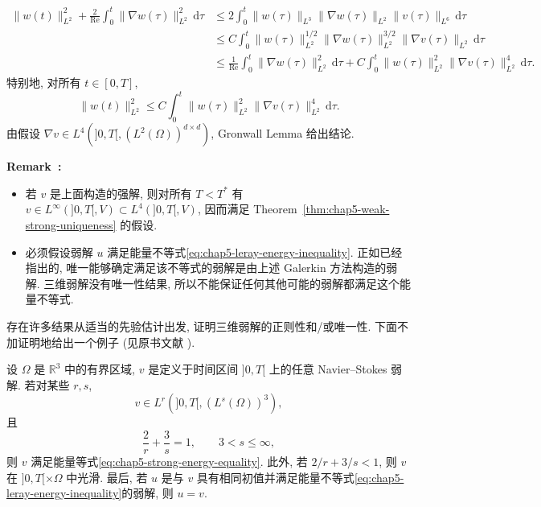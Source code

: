 \begin{Proof}
\begin{align*}
 \|w(t)\|_{L^2}^2+\frac2{\operatorname{Re}}\int_0^t\|\nabla w(\tau)\|_{L^2}^2\,\mathrm d\tau
 &\leq2\int_0^t\|w(\tau)\|_{L^3}\|\nabla w(\tau)\|_{L^2}\|v(\tau)\|_{L^6}\,\mathrm d\tau\\
 &\leq C\int_0^t\|w(\tau)\|_{L^2}^{1/2}
 \|\nabla w(\tau)\|_{L^2}^{3/2}\|\nabla v(\tau)\|_{L^2}\,\mathrm d\tau\\
 &\leq\frac1{\operatorname{Re}}\int_0^t\|\nabla w(\tau)\|_{L^2}^2\,\mathrm d\tau
 +C\int_0^t\|w(\tau)\|_{L^2}^2\|\nabla v(\tau)\|_{L^2}^4\,\mathrm d\tau.
\end{align*}
特别地, 对所有 $t\in[0,T]$,
\[
 \|w(t)\|_{L^2}^2\leq C\int_0^t\|w(\tau)\|_{L^2}^2\|\nabla v(\tau)\|_{L^2}^4\,\mathrm d\tau.
\]
由假设 $\nabla v\in L^4(]0,T[,(L^2(\Omega))^{d\times d})$, Gronwall Lemma 给出结论.
\end{Proof}

\par\noindent{}\textbf{Remark~\thechapterfivesectiontworemark:}\label{rem:chap5-weak-strong-remarks}
\begin{itemize}
 \item 若 $v$ 是上面构造的强解, 则对所有 $T<T^*$ 有 $v\in L^\infty(]0,T[,V)\subset L^4(]0,T[,V)$, 因而满足 Theorem~\ref{thm:chap5-weak-strong-uniqueness} 的假设.
 \item 必须假设弱解 $u$ 满足能量不等式\eqref{eq:chap5-leray-energy-inequality}. 正如已经指出的, 唯一能够确定满足该不等式的弱解是由上述 Galerkin 方法构造的弱解. 三维弱解没有唯一性结果, 所以不能保证任何其他可能的弱解都满足这个能量不等式.
\end{itemize}

存在许多结果从适当的先验估计出发, 证明三维弱解的正则性和/或唯一性. 下面不加证明地给出一个例子 (见原书文献 ).

\begin{Theorem}
\label{thm:chap5-prodi-serrin-condition}
设 $\Omega$ 是 $\mathbb R^3$ 中的有界区域, $v$ 是定义于时间区间 $]0,T[$ 上的任意 Navier--Stokes 弱解. 若对某些 $r,s$,
\begin{equation}
 v\in L^r(]0,T[,(L^s(\Omega))^3),
\label{eq:chap5-prodi-serrin-space}
\end{equation}
且
\begin{equation}
 \frac2r+\frac3s=1,
 \qquad 3<s\leq\infty,
\label{eq:chap5-prodi-serrin-exponents}
\end{equation}
则 $v$ 满足能量等式\eqref{eq:chap5-strong-energy-equality}. 此外, 若 $2/r+3/s<1$, 则 $v$ 在 $]0,T[\times\Omega$ 中光滑. 最后, 若 $u$ 是与 $v$ 具有相同初值并满足能量不等式\eqref{eq:chap5-leray-energy-inequality}的弱解, 则 $u=v$.
\end{Theorem}

